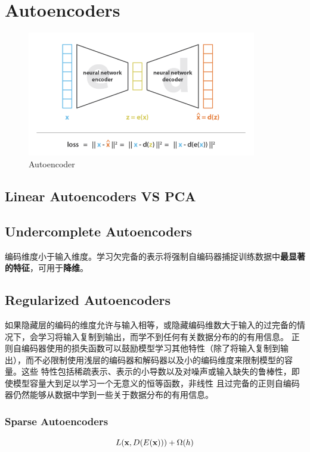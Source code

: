 \chapter{Autoencoders}

\begin{figure}[H]
    \centering
    \includegraphics[width=10cm]{images/ae.png}
    \caption{Autoencoder}
    \label{fig:autoencoder}
\end{figure}

\section{Linear Autoencoders VS PCA}


\section{Undercomplete Autoencoders}
编码维度小于输入维度。学习欠完备的表示将强制自编码器捕捉训练数据中\textbf{最显著的特征}，可用于\textbf{降维}。

\section{Regularized Autoencoders}
如果隐藏层的编码的维度允许与输入相等，或隐藏编码维数大于输入的过完备的情况下，会学习将输入复制到输出，而学不到任何有关数据分布的的有用信息。
正则自编码器使用的损失函数可以鼓励模型学习其他特性（除了将输入复制到输出），而不必限制使用浅层的编码器和解码器以及小的编码维度来限制模型的容量。这些
特性包括稀疏表示、表示的小导数以及对噪声或输入缺失的鲁棒性，即使模型容量大到足以学习一个无意义的恒等函数，非线性
且过完备的正则自编码器仍然能够从数据中学到一些关于数据分布的有用信息。

\subsection{Sparse Autoencoders}
\begin{equation}
    L(\mathbf{x}, D(E(\mathbf{x}))) + \Omega (h)
\end{equation}


